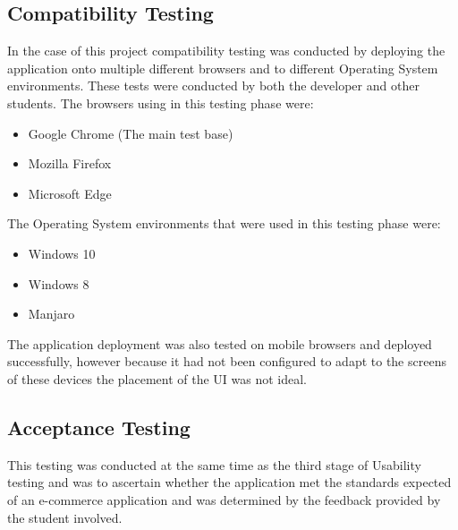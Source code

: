 \subsection{Compatibility Testing}
In the case of this project compatibility testing was conducted by deploying the application onto multiple different browsers and to different Operating System environments. These tests were conducted by both the developer and other students. The browsers using in this testing phase were:

\begin{itemize}
    \item Google Chrome (The main test base)
    \item Mozilla Firefox
    \item Microsoft Edge
\end{itemize}

The Operating System environments that were used in this testing phase were:

\begin{itemize}
    \item Windows 10
    \item Windows 8
    \item Manjaro
\end{itemize}

The application deployment was also tested on mobile browsers and deployed successfully, however because it had not been configured to adapt to the screens of these devices the placement of the UI was not ideal.

\subsection{Acceptance Testing}
This testing was conducted at the same time as the third stage of Usability testing and was to ascertain whether the application met the standards expected of an e-commerce application and was determined by the feedback provided by the student involved.

\newpage


